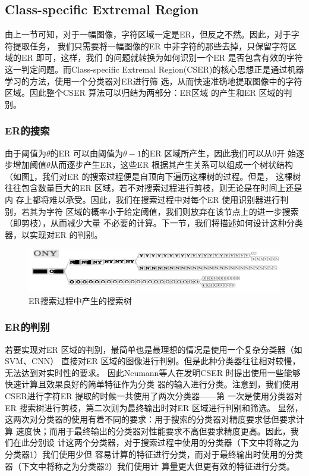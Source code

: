\subsection{Class-specific Extremal Region}

由上一节可知，对于一幅图像，字符区域一定是ER，但反之不然。因此，对于字符提取任务，
我们只需要将一幅图像的ER 中非字符的那些去掉，只保留字符区域的ER 即可，这样，我们
的问题就转换为如何识别一个ER 是否包含有效的字符这一判定问题。而Class-specific
Extremal Region(CSER)\cite{Neumann:2012ik}的核心思想正是通过机器学习的方法，使用一个分类器对ER进行筛
选，从而快速准确地提取图像中的字符区域。因此整个CSER 算法可以归结为两部分：ER区域
的产生和ER 区域的判别。

\subsubsection{ER的搜索}

由于阈值为$\theta$的ER 可以由阈值为$\theta-1$的ER 区域所产生，因此我们可以从0开
始逐步增加阈值$\theta$从而逐步产生ER，这些ER 根据其产生关系可以组成一个树状结构
（如图\ref{Fig:ERTree}，我们对ER 的搜索过程便是自顶向下遍历这棵树的过程。但是，
这棵树往往包含数量巨大的ER 区域，若不对搜索过程进行剪枝，则无论是在时间上还是内
存上都将难以承受。因此，我们在搜索过程中对每个ER 使用识别器进行判别，若其为字符
区域的概率小于给定阈值，我们则放弃在该节点上的进一步搜索（即剪枝），从而减少大量
不必要的计算。下一节，我们将描述如何设计这种分类器，以实现对ER 的判别。

\begin{figure}[ht]
  \centering
  \includegraphics[width=1.0\linewidth]{./Figure/ERTree.png}
  \caption{ER搜索过程中产生的搜索树}\label{Fig:ERTree}
\end{figure}

\subsubsection{ER的判别}

若要实现对ER 区域的判别，最简单也是最理想的情况是使用一个复杂分类器（如SVM、CNN）
直接对ER 区域的图像进行判别。但是此种分类器往往相对较慢，无法达到对实时性的要求。
因此Neumann等人在发明CSER 时提出使用一些能够快速计算且效果良好的简单特征作为分类
器的输入进行分类。注意到，我们使用CSER进行字符ER 提取的时候一共使用了两次分类器——第
一次是使用分类器对ER 搜索树进行剪枝，第二次则为最终输出时对ER 区域进行判别和筛选。
显然，这两次对分类器的使用有着不同的要求：用于搜索的分类器对精度要求低但要求计算
速度快；而用于最终输出的分类器对性能要求不高但要求精度更高。因此，我们在此分别设
计这两个分类器，对于搜索过程中使用的分类器（下文中将称之为分类器1）我们使用少但
容易计算的特征进行分类，而对于最终输出时使用的分类器（下文中将称之为分类器2）我们使用计
算量更大但更有效的特征进行分类。

